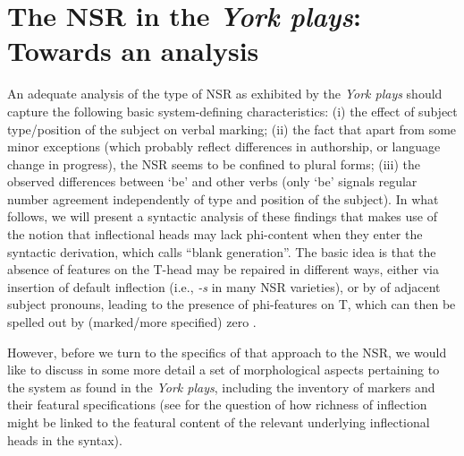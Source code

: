 \documentclass[output=paper]{langsci/langscibook}
\begin{document}
\section{The NSR in the \emph{York plays}: Towards an analysis}
\label{sec:towards-an-analysis}
An adequate analysis of the type of \gls{NSR} as
exhibited by the \emph{York plays} should capture the following basic
system-defining characteristics: (i) the effect of subject type/position of the
subject on verbal  marking; (ii) the fact that apart from some minor
exceptions (which probably reflect differences in authorship, or language
change in progress), the \gls{NSR} seems to be
confined to plural forms; (iii) the observed differences between `be' and other
verbs (only `be' signals regular number agreement independently of type and position of the subject). In what follows,
we will present a syntactic analysis of these findings that makes use of the
notion that inflectional heads may lack phi-content when they enter the
syntactic derivation, which \textcite{Roberts:2010} calls ``blank generation''.
The basic idea is that the absence of  features on the T-head
may be repaired in different ways, either via insertion of default inflection
(i.e., \emph{-s} in many \gls{NSR} varieties), or by
 of adjacent subject pronouns, leading to the presence of
phi-features on T, which can then be spelled out by (marked/more
specified) zero .

However, before we turn to the specifics of that approach to the
\gls{NSR}, we would like to discuss in some more
detail a set of morphological aspects pertaining to the  system
as found in the \emph{York plays}, including the inventory of markers and their
featural specifications (see  for the question of how richness
of inflection might be linked to the featural content of the relevant
underlying inflectional heads in the syntax).
\end{document}
